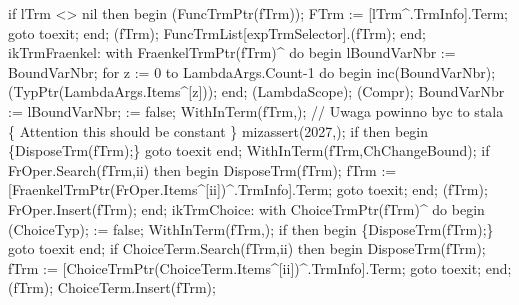             if lTrm <> nil then
            begin
               (FuncTrmPtr(fTrm));
               FTrm := [lTrm^.TrmInfo].Term;
               goto toexit;
            end;
            (fTrm);
            FuncTrmList[expTrmSelector].(fTrm);
         end;
         ikTrmFraenkel:
            with FraenkelTrmPtr(fTrm)^ do
         begin
            lBoundVarNbr := BoundVarNbr;
            for z := 0 to LambdaArgs.Count-1 do
            begin
               inc(BoundVarNbr);
               (TypPtr(LambdaArgs.Items^[z]));
            end;
            (LambdaScope);
            (Compr);
            BoundVarNbr := lBoundVarNbr;
             := false;
            WithInTerm(fTrm,);
            // Uwaga powinno byc to stala
            \{ Attention this should be constant \}
            mizassert(2027,);
            if  then
            begin \{DisposeTrm(fTrm);\}
               goto toexit
            end;
            WithInTerm(fTrm,ChChangeBound);
            if FrOper.Search(fTrm,ii) then
            begin
               DisposeTrm(fTrm);
               fTrm := [FraenkelTrmPtr(FrOper.Items^[ii])^.TrmInfo].Term;
               goto toexit;
            end;
            (fTrm);
            FrOper.Insert(fTrm);
         end;
         ikTrmChoice:
            with ChoiceTrmPtr(fTrm)^ do
         begin
            (ChoiceTyp);
             := false;
            WithInTerm(fTrm,);
            if  then
            begin \{DisposeTrm(fTrm);\}
               goto toexit
            end;
            if ChoiceTerm.Search(fTrm,ii) then
            begin
               DisposeTrm(fTrm);
               fTrm := [ChoiceTrmPtr(ChoiceTerm.Items^[ii])^.TrmInfo].Term;
               goto toexit;
            end;
            (fTrm);
            ChoiceTerm.Insert(fTrm);
